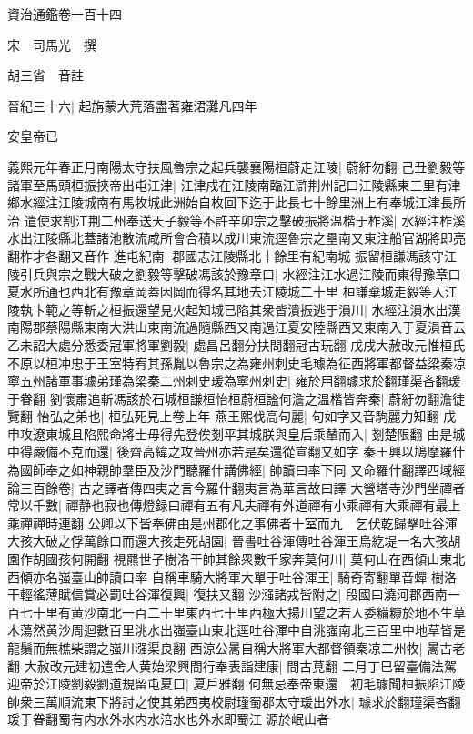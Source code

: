 資治通鑑卷一百十四


宋　司馬光　撰

胡三省　音註

晉紀三十六|{
	起旃蒙大荒落盡著雍涒灘凡四年}


安皇帝已

義熙元年春正月南陽太守扶風魯宗之起兵襲襄陽桓蔚走江陵|{
	蔚紆勿翻}
己丑劉毅等諸軍至馬頭桓振挾帝出屯江津|{
	江津戍在江陵南臨江滸荆州記曰江陵縣東三里有津鄉水經注江陵城南有馬牧城此洲始自枚回下迄于此長七十餘里洲上有奉城江津長所治}
遣使求割江荆二州奉送天子毅等不許辛卯宗之擊破振將温楷于柞溪|{
	水經注柞溪水出江陵縣北蓋諸池散流咸所會合積以成川東流逕魯宗之壘南又東注船官湖將即亮翻柞才各翻又音作}
進屯紀南|{
	郡國志江陵縣北十餘里有紀南城}
振留桓謙馮該守江陵引兵與宗之戰大破之劉毅等擊破馮該於豫章口|{
	水經注江水過江陵而東得豫章口夏水所通也西北有豫章岡蓋因岡而得名其地去江陵城二十里}
桓謙棄城走毅等入江陵執卞範之等斬之桓振還望見火起知城已陷其衆皆潰振逃于溳川|{
	水經注溳水出漢南陽郡蔡陽縣東南大洪山東南流過隨縣西又南過江夏安陸縣西又東南入于夏溳音云}
乙未詔大處分悉委冠軍將軍劉毅|{
	處昌呂翻分扶問翻冠古玩翻}
戊戌大赦改元惟桓氏不原以桓冲忠于王室特宥其孫胤以魯宗之為雍州刺史毛璩為征西將軍都督益梁秦凉寧五州諸軍事璩弟瑾為梁秦二州刺史瑗為寧州刺史|{
	雍於用翻璩求於翻瑾渠吝翻瑗于眷翻}
劉懷肅追斬馮該於石城桓謙桓怡桓蔚桓謐何澹之温楷皆奔秦|{
	蔚紆勿翻澹徒覽翻}
怡弘之弟也|{
	桓弘死見上卷上年}
燕王熙伐高句麗|{
	句如字又音駒麗力知翻}
戊申攻遼東城且陷熙命將士毋得先登俟剗平其城朕與皇后乘輦而入|{
	剗楚限翻}
由是城中得嚴備不克而還|{
	後齊高緯之攻晉州亦若是矣還從宣翻又如字}
秦王興以鳩摩羅什為國師奉之如神親帥羣臣及沙門聽羅什講佛經|{
	帥讀曰率下同}
又命羅什翻譯西域經論三百餘卷|{
	古之譯者傳四夷之言今羅什翻夷言為華言故曰譯}
大營塔寺沙門坐禪者常以千數|{
	禪静也寂也傳燈録曰禪有五有凡夫禪有外道禪有小乘禪有大乘禪有最上乘禪禪時連翻}
公卿以下皆奉佛由是州郡化之事佛者十室而九　乞伏乾歸擊吐谷渾大孩大破之俘萬餘口而還大孩走死胡園|{
	晉書吐谷渾傳吐谷渾王烏紇堤一名大孩胡園作胡國孩何開翻}
視羆世子樹洛干帥其餘衆數千家奔莫何川|{
	莫何山在西傾山東北西傾亦名嵹臺山帥讀曰率}
自稱車騎大將軍大單于吐谷渾王|{
	騎奇寄翻單音蟬}
樹洛干輕徭薄賦信賞必罰吐谷渾復興|{
	復扶又翻}
沙漒諸戎皆附之|{
	段國曰澆河郡西南一百七十里有黄沙南北一百二十里東西七十里西極大揚川望之若人委糒糠於地不生草木蕩然黄沙周迴數百里洮水出嵹臺山東北逕吐谷渾中自洮嵹南北三百里中地草皆是龍鬚而無樵柴謂之嵹川漒渠良翻}
西涼公暠自稱大將軍大都督領秦凉二州牧|{
	暠古老翻}
大赦改元建初遣舍人黄始梁興間行奉表詣建康|{
	間古莧翻}
二月丁巳留臺備法駕迎帝於江陵劉毅劉道規留屯夏口|{
	夏戶雅翻}
何無忌奉帝東還　初毛璩聞桓振陷江陵帥衆三萬順流東下將討之使其弟西夷校尉瑾蜀郡太守瑗出外水|{
	璩求於翻瑾渠吝翻瑗于眷翻蜀有内水外水内水涪水也外水即蜀江源於岷山者}

